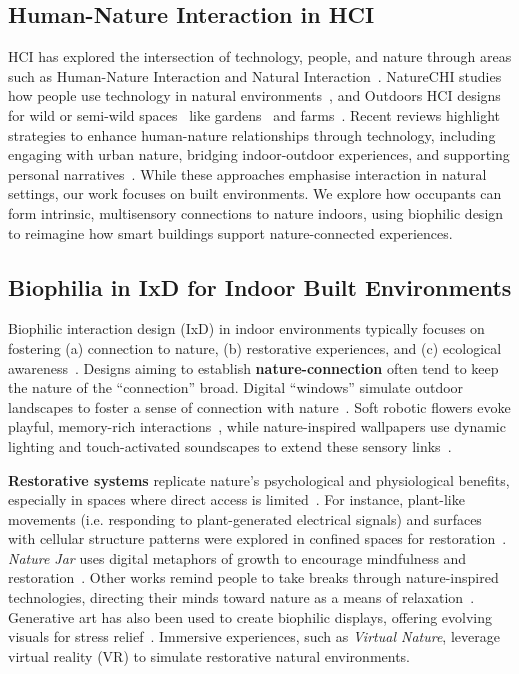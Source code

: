 \subsection{Human-Nature Interaction in HCI}
HCI has explored the intersection of technology, people, and nature through areas such as Human-Nature Interaction and Natural Interaction~\cite{hirsch2022survey}. NatureCHI studies how people use technology in natural environments~\cite{hakkila2016naturechi}, and Outdoors HCI designs for wild or semi-wild spaces~\cite{jones2018hci, mencarini2021designing} like gardens~\cite{rodgers2019hci} and farms~\cite{liu2019designing}. Recent reviews highlight strategies to enhance human-nature relationships through technology, including engaging with urban nature, bridging indoor-outdoor experiences, and supporting personal narratives~\cite{webber2023engaging, spors2023longing, mencarini2021designing}. While these approaches emphasise interaction in natural settings, our work focuses on built environments. We explore how occupants can form intrinsic, multisensory connections to nature indoors, using biophilic design to reimagine how smart buildings support nature-connected experiences.

\subsection{Biophilia in IxD for Indoor Built Environments}
Biophilic interaction design (IxD) in indoor environments typically focuses on fostering (a) connection to nature, (b) restorative experiences, and (c) ecological awareness~\cite{rao2025smart}. Designs aiming to establish \textbf{nature-connection} often tend to keep the nature of the ``connection'' broad. Digital ``windows'' simulate outdoor landscapes to foster a sense of connection with nature~\cite{wang2015intelligent, feng2019livenature}. Soft robotic flowers evoke playful, memory-rich interactions~\cite{chooi2022symbiosis, mcdonald2015nature}, while nature-inspired wallpapers use dynamic lighting and touch-activated soundscapes to extend these sensory links~\cite{buechley2010living}.

\textbf{Restorative systems} replicate nature’s psychological and physiological benefits, especially in spaces where direct access is limited~\cite{nicoly2024restorative,masters2022virtual}. For instance, plant-like movements (i.e. responding to plant-generated electrical signals) and surfaces with cellular structure patterns were explored in confined spaces for restoration~\cite{sabinson2021plant}. \emph{Nature Jar} uses digital metaphors of growth to encourage mindfulness and restoration~\cite{wang2022nature}. Other works remind people to take breaks through nature-inspired technologies, directing their minds toward nature as a means of relaxation~\cite{jung2024leaf}. Generative art has also been used to create biophilic displays, offering evolving visuals for stress relief~\cite{xing2024exploring}. Immersive experiences, such as \emph{Virtual Nature}, leverage virtual reality (VR) to simulate restorative natural environments. 

